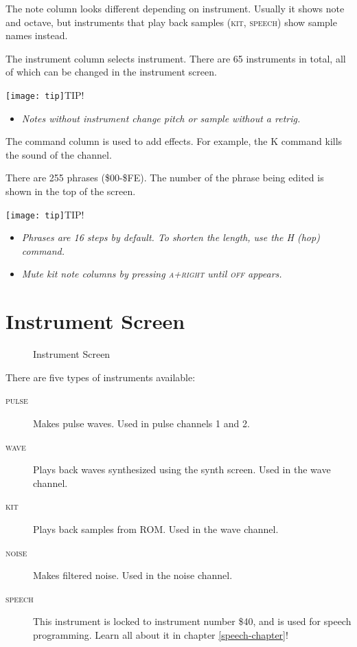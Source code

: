 The note column looks different depending on instrument. Usually it shows note and octave, but instruments that play back samples (\textsc{kit}, \textsc{speech}) show sample names instead.

The instrument column selects instrument. There are 65 instruments in total, all of which can be changed in the instrument screen.

\texttt{[image: tip]}TIP!
\begin{itemize}
    \item \textit{Notes without instrument change pitch or sample without a retrig.}
\end{itemize}

The command column is used to add effects. For example, the K command kills the sound of the channel.

There are 255 phrases (\$00-\$FE). The number of the phrase being edited is shown in the top of the screen.

\texttt{[image: tip]}TIP!
\begin{itemize}
    \item \textit{Phrases are 16 steps by default. To shorten the length, use the H (hop) command.}
    \item \textit{Mute kit note columns by pressing \textsc{a+right} until \textsc{off} appears.\footnotemark}
\end{itemize}


\section{Instrument Screen}

\begin{figure}[hbtp]
\centering
{}
\caption{Instrument Screen}
\label{fig:instr2}
\end{figure}

There are five types of instruments available:

\begin{description}
\item[\textsc{pulse}] Makes pulse waves. Used in pulse channels 1 and 2.
\item[\textsc{wave}] Plays back waves synthesized using the synth screen. Used in the wave channel.
\item[\textsc{kit}] Plays back samples from ROM. Used in the wave channel.
\item[\textsc{noise}] Makes filtered noise. Used in the noise channel.
\item[\textsc{speech}] This instrument is locked to instrument number \$40, and is used for speech programming. Learn all about it in chapter \ref{speech-chapter}!
\end{description}

